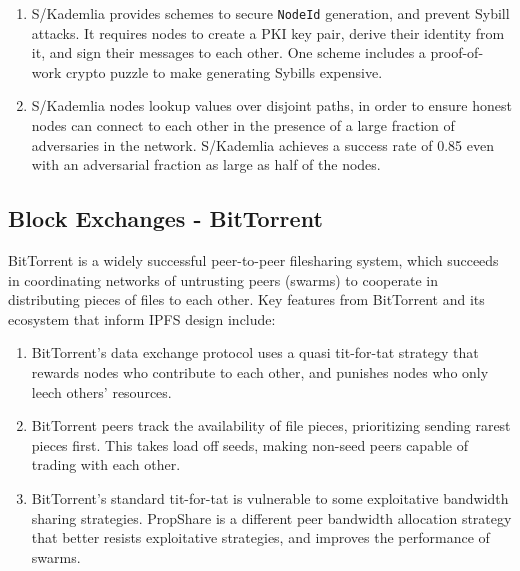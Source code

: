 \documentclass{sig-alternate}
\begin{document}
\begin{enumerate}

  \item S/Kademlia provides schemes to secure \texttt{NodeId} generation,
        and prevent Sybill attacks. It requires nodes to create a PKI key pair, derive their identity from it, and sign their messages to each other. One scheme includes a proof-of-work crypto puzzle to make generating Sybills expensive.

  \item S/Kademlia nodes lookup values over disjoint paths, in order to
        ensure honest nodes can connect to each other in the presence of a large fraction of adversaries in the network. S/Kademlia achieves a success rate of 0.85 even with an adversarial fraction as large as half of the nodes.

\end{enumerate}

\subsection{Block Exchanges - BitTorrent}

BitTorrent \cite{BitTorrent} is a widely successful peer-to-peer filesharing system, which succeeds in coordinating networks of untrusting peers (swarms) to cooperate in distributing pieces of files to each other. Key features from BitTorrent and its ecosystem that inform IPFS design include:

\begin{enumerate}
  \item BitTorrent's data exchange protocol uses a quasi tit-for-tat strategy
        that rewards nodes who contribute to each other, and punishes nodes who only leech others' resources.

  \item BitTorrent peers track the availability of file pieces, prioritizing
        sending rarest pieces first. This takes load off seeds, making non-seed peers capable of trading with each other.

  \item BitTorrent's standard tit-for-tat is vulnerable to some exploitative
        bandwidth sharing strategies. PropShare \cite{propshare} is a different peer bandwidth allocation strategy that better resists exploitative strategies, and improves the performance of swarms.

\end{enumerate}
\end{document}
